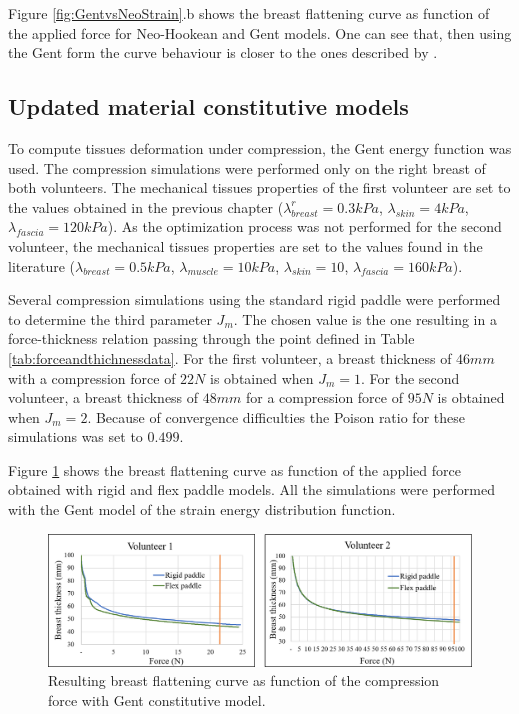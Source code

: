 Figure \ref{fig:GentvsNeoStrain}.b shows the breast flattening curve as function of the applied force for Neo-Hookean and Gent models. One can see that, then using the Gent form the curve behaviour is closer to the ones described by \cite{de_pain_2015}.

\subsection{Updated material constitutive models}

To compute tissues deformation under compression, the Gent energy function was used. The compression simulations were performed only on the right breast of both volunteers. The mechanical tissues properties of the first volunteer are set to the values obtained in the previous chapter ($\lambda_{breast}^r=0.3 kPa$, $\lambda_{skin}=4 kPa$, $\lambda_{fascia}=120 kPa$). As the optimization process was not performed for the second volunteer, the mechanical tissues properties are set to the values found in the literature ($\lambda_{breast}=0.5 kPa$, $\lambda_{muscle}= 10kPa$, $\lambda_{skin}=10$, $\lambda_{fascia}= 160kPa$).  

Several compression simulations using the standard rigid paddle were performed to determine the third parameter $J_m$. The chosen value is the one resulting in a force-thickness relation passing through the point defined in Table \ref{tab:forceandthichnessdata}. For the first volunteer, a breast thickness of $46mm$ with a compression force of $22N$ is obtained when $J_m = 1$. For the second volunteer, a breast thickness of $48mm$ for a compression force of $95N$ is obtained when $J_m = 2$. Because of convergence difficulties the Poison ratio for these simulations was set to $0.499$.

Figure \ref{fig:forceThicknessResults} shows the breast flattening curve as function of the applied force obtained with rigid and flex paddle models. All the simulations were performed with the Gent model of the strain energy distribution function. 

\begin{figure}[!h]
\centering
\includegraphics[width=1\textwidth,keepaspectratio]{figures/forceThicknessResults.png} 
\caption{Resulting breast flattening curve as function of the compression force with Gent constitutive model. }\label{fig:forceThicknessResults}
\end{figure}
    
